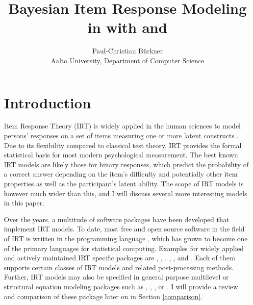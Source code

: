 \documentclass[
]{jss}
\author{
Paul-Christian Bürkner\\Aalto University, Department of Computer Science
}
\title{Bayesian Item Response Modeling in \proglang{R} with \pkg{brms} and
\proglang{Stan}}
\begin{document}
\hypertarget{introduction}{%
\section{Introduction}\label{introduction}}

Item Response Theory (IRT) is widely applied in the human sciences to
model persons' responses on a set of items measuring one or more latent
constructs \citep[for a comprehensive introduction
see][]{lord2012, embretson2013, vanderlinden1997}. Due to its
flexibility compared to classical test theory, IRT provides the formal
statistical basis for most modern psychological measurement. The best
known IRT models are likely those for binary responses, which predict
the probability of a correct answer depending on the item's difficulty
and potentially other item properties as well as the participant's
latent ability. The scope of IRT models is however much wider than this,
and I will discuss several more interesting models in this paper.

Over the years, a multitude of software packages have been developed
that implement IRT models. To date, most free and open source software
in the field of IRT is written in the programming language 
\citep{R}, which has grown to become one of the primary languages for
statistical computing. Examples for widely applied and actively
maintained IRT specific  packages are  \citep{eRm},
 \citep{ltm},  \citep{TAM},  \citep{mirt},
 \citep{sirt}, and 
\citep{psychotree1, psychotree2}. Each of them supports certain classes
of IRT models and related post-processing methods. Further, IRT models
may also be specified in general purpose multilevel or structural
equation modeling packages such as  \citep{lme4}, 
\citep{lavaan},  \citep{blavaan}, or 
\citep{MCMCglmm}. I will provide a review and comparison of these
package later on in Section \ref{comparison}.
\end{document}
